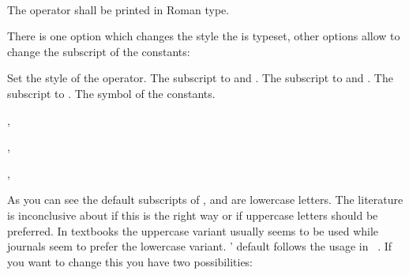 \documentclass{chemmacros-manual}
\begin{document}
\begin{example}
  \Ka\ \Kb\ \pKa\ \pKa[1] \pKb\ \pKb[1]
\end{example}

\begin{cnltxquote}
 The operator \p{} \textelp{} shall be printed in Roman type.
\end{cnltxquote}

There is one option which changes the style the \p{} is typeset, other options
allow to change the subscript of the constants:
\begin{options}
    Set the style of the \p{} operator.
    The subscript to  and .
    The subscript to  and .
    The subscript to .
    The symbol of the constants.
\end{options}
\begin{example}
  \pH, \pKa \par
   \pH, \pKa \par
   \pH, \pKa
\end{example}

As you can see the default subscripts of ,  and  are
lowercase letters.  The literature is inconclusive about if this is the right
way or if uppercase letters should be preferred.  In textbooks the uppercase
variant usually seems to be used while journals seem to prefer the lowercase
variant.  \chemmacros' default follows the usage in
~\cite{iupac:greenbook}.  If you want to change
this you have two possibilities:

\begin{example}
  \pKa
\end{example}
\end{document}

